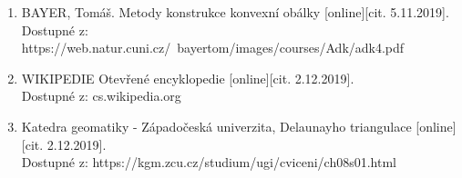 \documentclass[a4paper, 12pt]{article}
\begin{document}
\begin{enumerate}

\item  BAYER, Tomáš. Metody konstrukce konvexní obálky [online][cit. 5.11.2019]. \\
Dostupné z: https://web.natur.cuni.cz/~bayertom/images/courses/Adk/adk4.pdf \\

\item  WIKIPEDIE Otevřené encyklopedie [online][cit. 2.12.2019]. \\
Dostupné z: cs.wikipedia.org\\

\item  Katedra geomatiky - Západočeská univerzita, Delaunayho triangulace [online][cit. 2.12.2019]. \\
Dostupné z: https://kgm.zcu.cz/studium/ugi/cviceni/ch08s01.html  \\

\end{enumerate}
\end{document}
